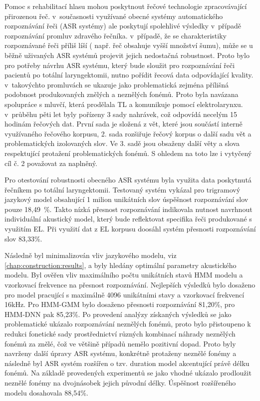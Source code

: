 Pomoc s rehabilitací hlasu mohou poskytnout řečové technologie zpracovávající přirozenou řeč. v~současnosti využívané obecné systémy automatického rozpoznávání řeči (ASR systémy) ale poskytují spolehlivé výsledky v~případě rozpoznávání promluv zdravého řečníka. v~případě, že se charakteristiky rozpoznávané řeči příliš líší ( např. řeč obsahuje vyšší množství šumu), může se u běžně uživaných ASR systémů projevit jejich nedostačná robustnost. Proto bylo pro potřeby návrhu ASR systému, který bude sloužit pro rozpoznávání řeči pacientů po totální laryngektomii, nutno pořídit řecová data odpovídající kvality. v~takovýchto promluvách se ukazuje jako problematická zejména přílišná podobnost produkovaných znělých a neznělých fonémů. Proto byla navázana spolupráce s mluvčí, která prodělala TL a komunikuje pomocí elektrolarynxu. v~průběhu pěti let byly pořízeny 3 sady nahrávek, což odpovídá necelým 15 hodinám řečových dat. První sada je složená z vět, které jsou součástí interně využívaného řečového korpusu, 2. sada rozšiřuje řečový korpus o další sadu vět a problematických izolovaných slov. Ve 3. sadě jsou obsaženy další věty a slova respektující protažení problematických fonémů.
S ohledem na toto lze i vytyčený cíl č. 2 považovat za naplněný.

Pro otestování robustnosti obecného ASR systému byla využita data poskytnutá řečníkem po totální laryngektomii. Testovaný systém vykázal pro trigramový jazykový model obsahující 1 milion unikátních slov úspěšnost rozpoznávání slov pouze 18,49~\%. Takto nízká přesnost rozpoznávání indikovala nutnost navrhnout individuální akustický model, který bude reflektovat specifika řeči produkované s využitím EL. Při využití dat z EL korpusu doosáhl systém přesnosti rozpoznávání slov 83,33\%.

Následně byl minimalizován vliv jazykového modelu, viz \ref{chap:construction:results}, a byly hledány optimální parametry akustického modelu. Byl ověřen vliv maximálního počtu unikátních stavů HMM modelu a vzorkovací frekvence na přesnost rozpoznávání. Nejlepších výsledků bylo dosaženo pro model pracující s maximálně 4096 unikátními stavy a vzorkovací frekvencí 16kHz. Pro HMM-GMM bylo dosaženo přesnosti rozpoznávání 81,20\%, pro HMM-DNN pak 85,23\%. Po provedení analýzy získaných výsledků se jako problematické ukázalo rozpoznávání neznělých fonémů, proto bylo přistoupeno k redukci fonetické sady prostřednictví různých kombinací náhrady neznělých fonémů za znělé, čož ve většině případů nemělo pozitivní dopad. Proto byly navrženy další úpravy ASR systému, konkrétně protaženy neznělé fonémy a následně byl ASR systém rozšířen o tzv. duration model akcentující právě délku fonémů. Na základě provedených experimentů se jako vhodné ukázalo prodloužit neznělé fonémy na dvojnásobek jejich původní délky. Úspěšnost rozšířeného modelu dosahovala 88,54\%.

